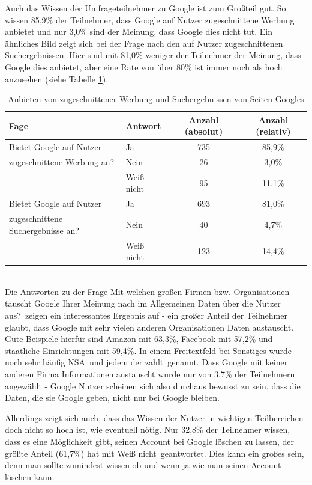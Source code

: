 Auch das Wissen der Umfrageteilnehmer zu Google ist zum Großteil gut. So wissen 85,9\% der Teilnehmer, dass Google auf Nutzer zugeschnittene Werbung anbietet und nur 3,0\% sind der Meinung, dass Google dies nicht tut. Ein ähnliches Bild zeigt sich bei der Frage nach den auf Nutzer zugeschnittenen Suchergebnissen. Hier sind mit 81,0\%  weniger der Teilnehmer der Meinung, dass Google dies anbietet, aber eine Rate von über 80\% ist immer noch als hoch anzusehen (siehe Tabelle \ref{fittingAdsAndSearch}).\\
\begin{table}
	\begin{tabular}[]{ l | l | c | c}
		\hline
		Fage & Antwort & Anzahl (absolut) & Anzahl (relativ)\\ \hline \hline
		Bietet Google auf Nutzer& Ja & 735 & 85,9\%\\
		zugeschnittene Werbung an? & Nein & 26 & 3,0\%\\
		& Weiß nicht & 95 & 11,1\% \\
		\hline
		Bietet Google auf Nutzer& Ja & 693 & 81,0\% \\
		zugeschnittene Suchergebnisse an? & Nein & 40 & 4,7\% \\
		& Weiß nicht & 123 & 14,4\% \\
		 \hline
	\end{tabular}
	\caption{Anbieten von zugeschnittener Werbung und Suchergebnissen von Seiten Googles}\label{fittingAdsAndSearch}
\end{table}\\
Die Antworten zu der Frage \glqq Mit welchen großen Firmen bzw. Organisationen tauscht Google Ihrer Meinung nach im Allgemeinen Daten über die Nutzer aus?\grqq\ zeigen ein interessantes Ergebnis auf - ein großer Anteil der Teilnehmer glaubt, dass Google mit sehr vielen anderen Organisationen Daten austauscht. Gute Beispiele hierfür sind Amazon mit 63,3\%, Facebook mit 57,2\% und staatliche Einrichtungen mit 59,4\%. In einem Freitextfeld bei Sonstiges wurde noch sehr häufig \glqq NSA\grqq\ und \glqq jedem der zahlt\grqq\ genannt. Dass Google mit keiner anderen Firma Informationen austauscht wurde nur von 3,7\% der Teilnehmern angewählt - Google Nutzer scheinen sich also durchaus bewusst zu sein, dass die Daten, die sie Google geben, nicht nur bei Google bleiben.

Allerdings zeigt sich auch, dass das Wissen der Nutzer in wichtigen Teilbereichen doch nicht so hoch ist, wie eventuell nötig. Nur 32,8\% der  Teilnehmer wissen, dass es eine Möglichkeit gibt, seinen Account bei Google löschen zu lassen, der größte Anteil (61,7\%) hat mit \glqq Weiß nicht\grqq\ geantwortet. Dies kann ein großes  sein, denn man sollte zumindest wissen ob und wenn ja wie man seinen Account löschen kann.

